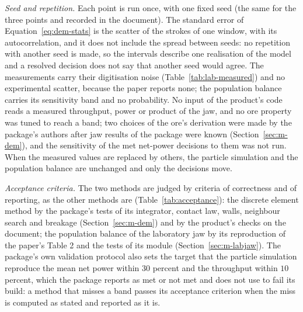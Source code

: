 \emph{Seed and repetition.} Each point is run once, with one fixed seed (the same for the three points and recorded in the document). The standard error of Equation~\eqref{eq:dem-stats} is the scatter of the strokes of one window, with its autocorrelation, and it does not include the spread between seeds: no repetition with another seed is made, so the intervals describe one realisation of the model and a resolved decision does not say that another seed would agree. The measurements carry their digitisation noise (Table~\ref{tab:lab-measured}) and no experimental scatter, because the paper reports none; the population balance carries its sensitivity band and no probability. No input of the product's code reads a measured throughput, power or product of the jaw, and no ore property was tuned to reach a band; two choices of the ore's derivation were made by the package's authors after jaw results of the package were known (Section~\ref{sec:m-dem}), and the sensitivity of the met net-power decisions to them was not run. When the measured values are replaced by others, the particle simulation and the population balance are unchanged and only the decisions move.

\emph{Acceptance criteria.} The two methods are judged by criteria of correctness and of reporting, as the other methods are (Table~\ref{tab:acceptance}): the discrete element method by the package's tests of its integrator, contact law, walls, neighbour search and breakage (Section~\ref{sec:m-dem}) and by the product's checks on the document; the population balance of the laboratory jaw by its reproduction of the paper's Table 2 and the tests of its module (Section~\ref{sec:m-labjaw}). The package's own validation protocol also sets the target that the particle simulation reproduce the mean net power within $30$ percent and the throughput within $10$ percent, which the package reports as met or not met and does not use to fail its build: a method that misses a band passes its acceptance criterion when the miss is computed as stated and reported as it is.


